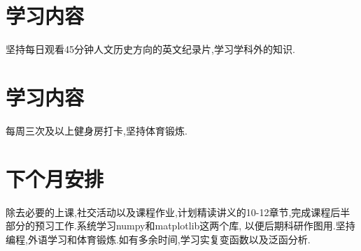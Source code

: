 \documentclass[
	12pt, %
]{fphw}
\begin{document}
\section*{学习内容\uppercase\expandafter{}}
坚持每日观看45分钟人文历史方向的英文纪录片,学习学科外的知识.


\section*{学习内容\uppercase\expandafter{}}
每周三次及以上健身房打卡,坚持体育锻炼.


\section*{下个月安排}
除去必要的上课,社交活动以及课程作业,计划精读讲义的10-12章节,完成课程后半部分的预习工作.系统学习numpy和matplotlib这两个库,
以便后期科研作图用.坚持编程,外语学习和体育锻炼.如有多余时间,学习实复变函数以及泛函分析. 
\end{document}
